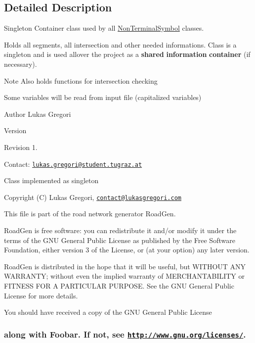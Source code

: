\subsection{Detailed Description}
Singleton Container class used by all \hyperlink{class_non_terminal_symbol}{Non\+Terminal\+Symbol} classes. 

Holds all segments, all intersection and other needed informations. Class is a singleton and is used allover the project as a {\bfseries shared} {\bfseries information} {\bfseries container} (if necessary).

\begin{DoxyNote}{Note}
Also holds functions for intersection checking 

Some variables will be read from input file (capitalized variables)
\end{DoxyNote}
\begin{DoxyAuthor}{Author}
Lukas Gregori 
\end{DoxyAuthor}
\begin{DoxyVersion}{Version}

\end{DoxyVersion}
\begin{DoxyParagraph}{Revision}
1. 
\end{DoxyParagraph}


Contact\+: \href{mailto:lukas.gregori@student.tugraz.at}{\tt lukas.\+gregori@student.\+tugraz.\+at}

Class implemented as singleton 

 Copyright (C) Lukas Gregori, \href{mailto:contact@lukasgregori.com}{\tt contact@lukasgregori.\+com}

This file is part of the road network generator Road\+Gen.

Road\+Gen is free software\+: you can redistribute it and/or modify it under the terms of the G\+NU General Public License as published by the Free Software Foundation, either version 3 of the License, or (at your option) any later version.

Road\+Gen is distributed in the hope that it will be useful, but W\+I\+T\+H\+O\+UT A\+NY W\+A\+R\+R\+A\+N\+TY; without even the implied warranty of M\+E\+R\+C\+H\+A\+N\+T\+A\+B\+I\+L\+I\+TY or F\+I\+T\+N\+E\+SS F\+OR A P\+A\+R\+T\+I\+C\+U\+L\+AR P\+U\+R\+P\+O\+SE. See the G\+NU General Public License for more details.

You should have received a copy of the G\+NU General Public License \subsubsection*{along with Foobar. If not, see \href{http://www.gnu.org/licenses/}{\tt http\+://www.\+gnu.\+org/licenses/}. }

